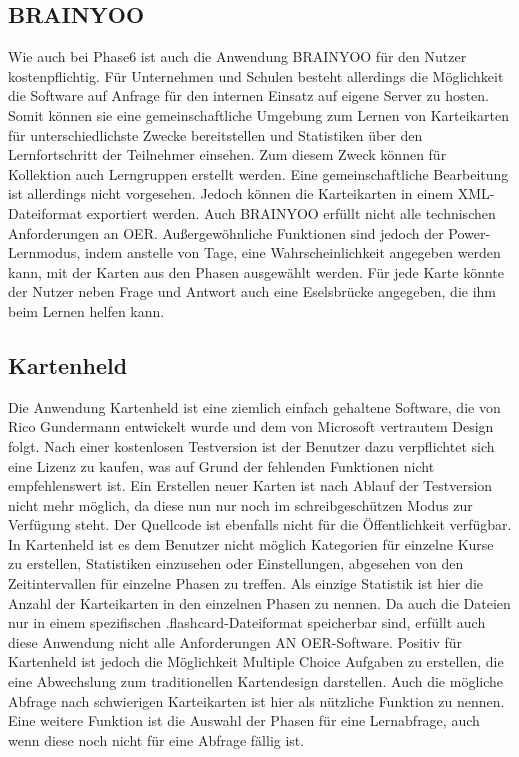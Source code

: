 \subsection{BRAINYOO}
Wie auch bei Phase6 ist auch die Anwendung BRAINYOO \cite{brainyoo} für den Nutzer kostenpflichtig. Für Unternehmen und Schulen besteht allerdings die Möglichkeit die Software auf Anfrage für den internen Einsatz auf eigene Server zu hosten. Somit können sie eine gemeinschaftliche Umgebung zum Lernen von Karteikarten für unterschiedlichste Zwecke bereitstellen und Statistiken über den Lernfortschritt der Teilnehmer einsehen. Zum diesem Zweck können für Kollektion auch Lerngruppen erstellt werden. Eine gemeinschaftliche Bearbeitung ist allerdings nicht vorgesehen. Jedoch können die Karteikarten in einem XML-Dateiformat exportiert werden. Auch BRAINYOO erfüllt nicht alle technischen Anforderungen an OER.
Außergewöhnliche Funktionen sind jedoch der Power-Lernmodus, indem anstelle von Tage, eine Wahrscheinlichkeit angegeben werden kann, mit der Karten aus den Phasen ausgewählt werden. Für jede Karte könnte der Nutzer neben Frage und Antwort auch eine Eselsbrücke angegeben, die ihm beim Lernen helfen kann.

\subsection{Kartenheld}
Die Anwendung Kartenheld \cite{kartenheld} ist eine ziemlich einfach gehaltene Software, die von Rico Gundermann entwickelt wurde und dem von Microsoft vertrautem Design folgt. Nach einer kostenlosen Testversion ist der Benutzer dazu verpflichtet sich eine Lizenz zu kaufen, was auf Grund der fehlenden Funktionen nicht empfehlenswert ist. Ein Erstellen neuer Karten ist nach Ablauf der Testversion nicht mehr möglich, da diese nun nur noch im schreibgeschützen Modus zur Verfügung steht. Der Quellcode ist ebenfalls nicht für die Öffentlichkeit verfügbar. In Kartenheld ist es dem Benutzer nicht möglich Kategorien für einzelne Kurse zu erstellen, Statistiken einzusehen oder Einstellungen, abgesehen von den Zeitintervallen für einzelne Phasen zu treffen. Als einzige Statistik ist hier die Anzahl der Karteikarten in den einzelnen Phasen zu nennen. Da auch die Dateien nur in einem spezifischen .flashcard-Dateiformat speicherbar sind, erfüllt auch diese Anwendung nicht alle Anforderungen AN OER-Software.
Positiv für Kartenheld ist jedoch die Möglichkeit Multiple Choice Aufgaben zu erstellen, die eine Abwechslung zum traditionellen Kartendesign darstellen. Auch die mögliche Abfrage nach schwierigen Karteikarten ist hier als nützliche Funktion zu nennen. Eine weitere Funktion ist die Auswahl der Phasen für eine Lernabfrage, auch wenn diese noch nicht für eine Abfrage fällig ist. \\


